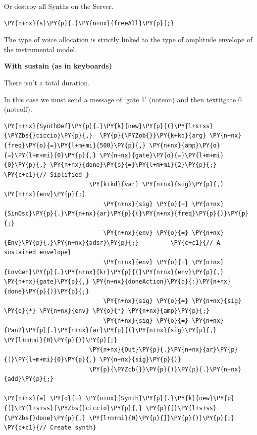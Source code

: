 Or destroy all Synths on the Server.

    \begin{tcolorbox}[breakable, size=fbox, boxrule=1pt, pad at break*=1mm,colback=cellbackground, colframe=cellborder]
\begin{Verbatim}[commandchars=\\\{\}]
\PY{n+nx}{s}\PY{p}{.}\PY{n+nx}{freeAll}\PY{p}{;}
\end{Verbatim}
\end{tcolorbox}

The type of voice allocation is strictly linked to the type of amplitude envelope of the instrumental model.

\textbf{With sustain (as in keyboards)}

There isn't a total duration.

In this case we must send a message of `gate 1' (noteon) and then textit{gate 0} (noteoff).

    \begin{tcolorbox}[breakable, size=fbox, boxrule=1pt, pad at break*=1mm,colback=cellbackground, colframe=cellborder]
\begin{Verbatim}[commandchars=\\\{\}]
\PY{n+nx}{SynthDef}\PY{p}{.}\PY{k}{new}\PY{p}{(}\PY{l+s+ss}{\PYZbs{}ciccio}\PY{p}{,}  \PY{p}{\PYZob{}}\PY{k+kd}{arg} \PY{n+nx}{freq}\PY{o}{=}\PY{l+m+mi}{500}\PY{p}{,} \PY{n+nx}{amp}\PY{o}{=}\PY{l+m+mi}{0}\PY{p}{,} \PY{n+nx}{gate}\PY{o}{=}\PY{l+m+mi}{0}\PY{p}{,} \PY{n+nx}{done}\PY{o}{=}\PY{l+m+mi}{2}\PY{p}{;}   \PY{c+c1}{// Siplified }
                        \PY{k+kd}{var} \PY{n+nx}{sig}\PY{p}{,} \PY{n+nx}{env}\PY{p}{;}
                            \PY{n+nx}{sig} \PY{o}{=} \PY{n+nx}{SinOsc}\PY{p}{.}\PY{n+nx}{ar}\PY{p}{(}\PY{n+nx}{freq}\PY{p}{)}\PY{p}{;}
                            \PY{n+nx}{env} \PY{o}{=} \PY{n+nx}{Env}\PY{p}{.}\PY{n+nx}{adsr}\PY{p}{;}         \PY{c+c1}{// A sustained envelope}
                            \PY{n+nx}{env} \PY{o}{=} \PY{n+nx}{EnvGen}\PY{p}{.}\PY{n+nx}{kr}\PY{p}{(}\PY{n+nx}{env}\PY{p}{,} \PY{n+nx}{gate}\PY{p}{,} \PY{n+nx}{doneAction}\PY{o}{:}\PY{n+nx}{done}\PY{p}{)}\PY{p}{;}
                            \PY{n+nx}{sig} \PY{o}{=} \PY{n+nx}{sig} \PY{o}{*} \PY{n+nx}{env} \PY{o}{*} \PY{n+nx}{amp}\PY{p}{;}
                            \PY{n+nx}{sig} \PY{o}{=} \PY{n+nx}{Pan2}\PY{p}{.}\PY{n+nx}{ar}\PY{p}{(}\PY{n+nx}{sig}\PY{p}{,} \PY{l+m+mi}{0}\PY{p}{)}\PY{p}{;}
                        \PY{n+nx}{Out}\PY{p}{.}\PY{n+nx}{ar}\PY{p}{(}\PY{l+m+mi}{0}\PY{p}{,} \PY{n+nx}{sig}\PY{p}{)}
                        \PY{p}{\PYZcb{}}\PY{p}{)}\PY{p}{.}\PY{n+nx}{add}\PY{p}{;}                               

\PY{n+nx}{a} \PY{o}{=} \PY{n+nx}{Synth}\PY{p}{.}\PY{k}{new}\PY{p}{(}\PY{l+s+ss}{\PYZbs{}ciccio}\PY{p}{,} \PY{p}{[}\PY{l+s+ss}{\PYZbs{}done}\PY{p}{,} \PY{l+m+mi}{0}\PY{p}{]}\PY{p}{)}\PY{p}{;} \PY{c+c1}{// Create synth}
\end{Verbatim}
\end{tcolorbox}

